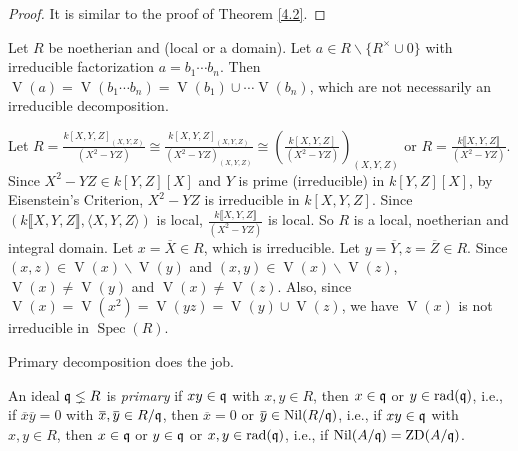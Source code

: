 \begin{proof}
    It is similar to the proof of Theorem \ref{4.2}.
\end{proof}

\begin{discussion}\label{4.8}
    Let $R$ be noetherian and (local or a domain). Let $a \in R \smallsetminus \{R^{\times} \cup 0\}$ with irreducible factorization $a = b_1 \cdots b_n$. Then $\operatorname{V}(a) = \operatorname{V}(b_1 \cdots b_n) = \operatorname{V}(b_1) \cup \cdots \operatorname{V}(b_n)$, which are not necessarily an irreducible decomposition. 
\end{discussion}

\begin{example}\label{4.9}
    Let $R = \frac{k[X,Y,Z]_{(X,Y,Z)}}{(X^{2}-YZ)} \cong \frac{k[X,Y,Z]_{(X,Y,Z)}}{(X^{2}-YZ)_{(X,Y,Z)}} \cong (\frac{k[X,Y,Z]}{(X^{2}-YZ)})_{(X,Y,Z)}$ or $R = \frac{k\llbracket X,Y,Z \rrbracket }{(X^{2}-YZ)}$. Since $X^{2}-YZ \in k[Y,Z][X]$ and $Y$ is prime (irreducible) in $k[Y,Z][X]$, by Eisenstein’s Criterion, $X^{2}-YZ$ is irreducible in $k[X,Y,Z]$. Since $(k\llbracket X,Y,Z \rrbracket,\langle X,Y,Z \rangle)$ is local, $\frac{k\llbracket X,Y,Z \rrbracket }{(X^{2}-YZ)}$ is local. So $R$ is a local, noetherian and integral domain. Let $x = \overbar{X} \in R$, which is irreducible. Let $y = \overline Y, z = \overline Z \in R$. Since $(x,z) \in \operatorname{V}(x) \smallsetminus \operatorname{V}(y)$ and $(x,y) \in \operatorname{V}(x) \smallsetminus \operatorname{V}(z)$, $\operatorname{V}(x) \neq \operatorname{V}(y)$ and $\operatorname{V}(x) \neq \operatorname{V}(z)$. Also, since $\operatorname{V}(x) = \operatorname{V}(x^{2}) = \operatorname{V}(yz) = \operatorname{V}(y) \cup \operatorname{V}(z)$, we have $\operatorname{V}(x)$ is not irreducible in $\operatorname{Spec}(R)$. 
\end{example}

\noindent Primary decomposition does the job.

\begin{definition}\label{4.10}
    An ideal $\mathfrak{q} \lneq R$ is \emph{primary} if $xy \in \mathfrak{q}$ with $x,y \in R$, then $x \in \mathfrak{q}$ or $y \in \operatorname{rad}(\mathfrak{q})$, i.e., if $\overbar{x} \overbar{y} = 0$ with $\overbar{x}, \overbar{y} \in R/\ffq$, then $\overbar{x} = 0$ or $\overbar{y} \in \operatorname{Nil}(R/\ffq)$, i.e., if $xy \in \mathfrak{q}$ with $x,y \in R$, then $x \in \mathfrak{q}$ or $y \in \mathfrak{q}$ or $x,y \in \operatorname{rad}(\mathfrak{q})$, i.e., if $\operatorname{Nil}(A/\mathfrak{q}) = \operatorname{ZD}(A/\mathfrak{q})$.
\end{definition}

